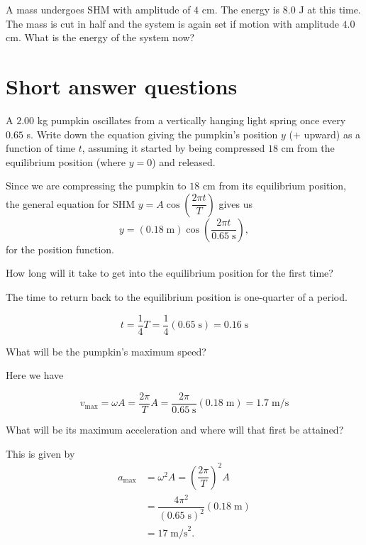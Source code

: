 \documentclass{ximera}
\begin{document}
\begin{interactive}[interactiveContent.js]
\begin{question}
 A mass undergoes SHM with amplitude of $4$ cm. The energy is $8.0$ J at this time. The mass is cut in half and
the system is again set if motion with amplitude $4.0$ cm. What is the energy of the system now?
\begin{solution}
\begin{multiple-choice}
\end{multiple-choice}
\end{solution}
\end{question}

\section*{Short answer questions}
\begin{question}
A $2.00$ kg pumpkin oscillates from a vertically hanging light spring once every $0.65$ s. Write down the equation giving the pumpkin's position $y$ ($+$ upward) as a function of time $t$, assuming it started
by being compressed $18$ cm from the equilibrium position (where $y=0$) and released.
\begin{solution}
Since we are compressing the pumpkin to $18$ cm from its equilibrium position, the general equation for SHM $y=A\cos\left(\dfrac{2\pi t}{T}\right)$ gives
us
$$
y=(0.18\;\text{m})\cos\left(\dfrac{2\pi t}{0.65\;\text{s}}\right),
$$
for the position function.
\end{solution}
How long will it take to get into the equilibrium position for the first time?
\begin{solution}
The time to return back to the equilibrium position is one-quarter of a period.

$$
t=\dfrac{1}{4}T=\dfrac{1}{4}(0.65\;\text{s})=\boxed{0.16\;\text{s}}
$$

\end{solution}
What will be the pumpkin's maximum speed?
\begin{solution}
Here we have

$$
v_{\text{max}}=\omega A=\dfrac{2\pi}{T}A=\dfrac{2\pi}{0.65\;\text{s}}(0.18\;\text{m})=\boxed{1.7\;\text{m/s}}
$$
\end{solution}
What will be its maximum acceleration and where will that first be attained?
\begin{solution}
This is given by
\begin{align*}
a_{\text{max}}&=\omega^2 A=\left(\dfrac{{2\pi}}{T}\right)^2A\\
&=\dfrac{4\pi^2}{(0.65\;\text{s})^2}(0.18\;\text{m})\\
&=\boxed{17\;\text{m/s}^2}.
\end{align*}


\end{solution}
\end{question}
\end{interactive}
\end{document}
